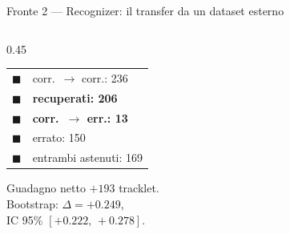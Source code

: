 \documentclass[aspectratio=169,10pt]{beamer}
\begin{document}
\begin{frame}{Fronte 2 --- Recognizer: il transfer da un dataset esterno}
\begin{columns}[T]
\begin{column}{0.45\textwidth}
      \scriptsize
      \begin{tabular}{@{}cl@{}}
        \textcolor{cOk}{$\blacksquare$} & corr.\ $\to$ corr.: 236 \\
        \textcolor{cOk!45!white}{$\blacksquare$} & \textbf{recuperati: 206} \\
        \textcolor{cWarn}{$\blacksquare$} & \textbf{corr.\ $\to$ err.: 13} \\
        \textcolor{cWarn!40!white}{$\blacksquare$} & errato: 150 \\
        \textcolor{cNeutral}{$\blacksquare$} & entrambi astenuti: 169 \\
      \end{tabular}
      \vspace{0.5em}

      \scriptsize
      Guadagno netto $+193$ tracklet.\\
      Bootstrap: $\Delta = +0.249$,\\ IC 95\% $[+0.222,\, +0.278]$.
    \end{column}
  \end{columns}
\end{frame}
\end{document}
